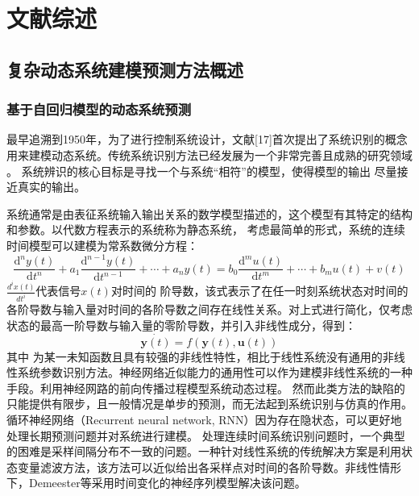 
\chapter{文献综述}
\section{复杂动态系统建模预测方法概述}
\subsection{基于自回归模型的动态系统预测}
最早追溯到1950年，为了进行控制系统设计，文献[17]首次提出了系统识别的概念用来建模动态系统。传统系统识别方法已经发展为一个非常完善且成熟的研究领域
\cite{le2013system,gevers2006personal,ljung2008perspectives,ljung2011four,Ljung2020}。
系统辨识的核心目标是寻找一个与系统“相符”的模型，使得模型的输出 尽量接近真实的输出。

系统通常是由表征系统输入输出关系的数学模型描述的，这个模型有其特定的结构和参数。以代数方程表示的系统称为静态系统，
考虑最简单的形式，系统的连续时间模型可以建模为常系数微分方程：
\begin{equation}
\frac{\mathrm{d}^{n} y(t)}{\mathrm{d} t^{n}}+a_{1} \frac{\mathrm{d}^{n-1} y(t)}{\mathrm{d} t^{n-1}}+\cdots+a_{n} y(t)=b_{0} \frac{\mathrm{d}^{m} u(t)}{\mathrm{d} t^{m}}+\cdots+b_{m} u(t)+v(t)
\end{equation}
$\frac{d^{i} x(t)}{d t^{i}}$代表信号$x(t)$对时间的 阶导数，该式表示了在任一时刻系统状态对时间的各阶导数与输入量对时间的各阶导数之间存在线性关系。对上式进行简化，仅考虑状态的最高一阶导数与输入量的零阶导数，并引入非线性成分，得到：
\begin{equation}
\dot {\boldsymbol y(t)}=f(\boldsymbol y(t), \boldsymbol{u}(t))
\end{equation}
其中 为某一未知函数且具有较强的非线性特性，相比于线性系统没有通用的非线性系统参数识别方法。神经网络近似能力的通用性可以作为建模非线性系统的一种手段\cite{funahashi1993approximation}。利用神经网路的前向传播过程模型系统动态过程\cite{temeng1995model, tan1996nonlinear}。
然而此类方法的缺陷的只能提供有限步，且一般情况是单步的预测，而无法起到系统识别与仿真的作用。循环神经网络（Recurrent neural network, RNN）因为存在隐状态，可以更好地处理长期预测问题并对系统进行建模\cite{delgado1995dynamic, zamarreno1998state}。
处理连续时间系统识别问题时，一个典型的困难是采样间隔分布不一致的问题。一种针对线性系统的传统解决方案是利用状态变量滤波方法，该方法可以近似给出各采样点对时间的各阶导数。非线性情形下，Demeester等\cite{demeester2020system}采用时间变化的神经序列模型解决该问题。

